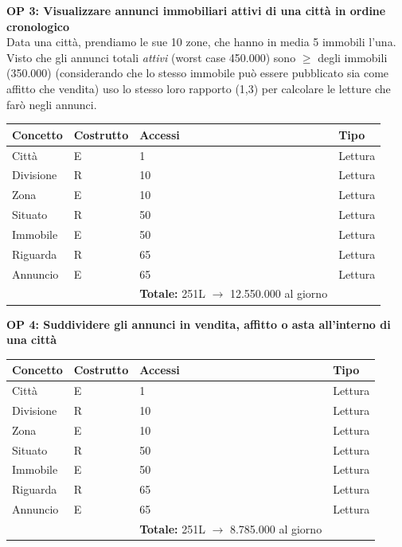 \documentclass[a4paper,12pt]{report}
\begin{document}
            \newpage
            \noindent
            \textbf{OP 3: Visualizzare annunci immobiliari attivi di una città in ordine cronologico} \\
            Data una città, prendiamo le sue 10 zone, che hanno in media 5 immobili l'una. Visto che gli annunci totali \textit{attivi} (worst case 450.000) 
            sono $\ge$ degli immobili (350.000) (considerando che lo stesso immobile può essere pubblicato sia come affitto che vendita)
            uso lo stesso loro rapporto (1,3) per calcolare le letture che farò negli annunci.
        	\begin{table}[H]
            \centering
             \begin{tabular}{llll}
             \rowcolor{yellow!20} \textbf{Concetto} & \textbf{Costrutto} & \textbf{Accessi} & \textbf{Tipo}\\ [0.5ex] 
             \hline
             Città & E & 1 & Lettura \\ 
             Divisione & R & 10 & Lettura \\ 
             Zona & E & 10 & Lettura \\ 
             Situato & R & 50 & Lettura \\ 
             Immobile & E & 50 & Lettura \\ 
             Riguarda & R & 65 & Lettura \\ 
             Annuncio & E & 65 & Lettura \\ 
             \hline
                \rowcolor{yellow!20} &   & \textbf{Totale:} 251L $\rightarrow$ 12.550.000 al giorno &  \\ [1ex] 
             
             \end{tabular}
            \end{table}

            \noindent
            \textbf{OP 4: Suddividere gli annunci in vendita, affitto o asta all’interno di una città}
        	\begin{table}[H]
            \centering
             \begin{tabular}{llll}
             \rowcolor{yellow!20} \textbf{Concetto} & \textbf{Costrutto} & \textbf{Accessi} & \textbf{Tipo}\\ [0.5ex] 
             \hline
             Città & E & 1 & Lettura \\ 
             Divisione & R & 10 & Lettura \\ 
             Zona & E & 10 & Lettura \\ 
             Situato & R & 50 & Lettura \\ 
             Immobile & E & 50 & Lettura \\ 
             Riguarda & R & 65 & Lettura \\ 
             Annuncio & E & 65 & Lettura \\ 
             \hline
                \rowcolor{yellow!20} &   & \textbf{Totale:} 251L $\rightarrow$ 8.785.000 al giorno &  \\ [1ex] 
             
             \end{tabular}
            \end{table}
\end{document}
